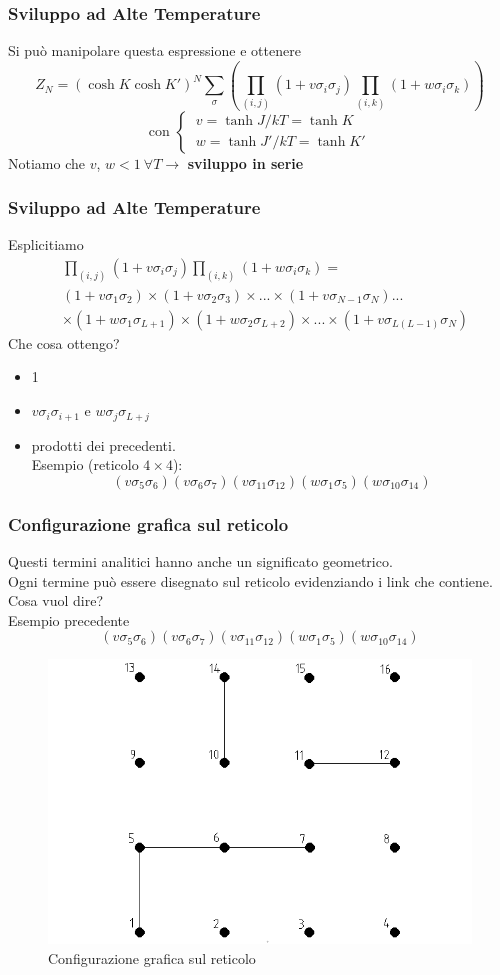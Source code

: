\documentclass[11pt]{beamer}
\begin{document}
\begin{frame}
\frametitle{Sviluppo ad Alte Temperature}
Si può manipolare questa espressione e ottenere
$$
Z_N=(\cosh{K}\cosh{K'})^N\sum_{\sigma}\left(\prod_{(i,j)}(1+v\sigma_i\sigma_j)\prod_{(i,k)}(1+w\sigma_i\sigma_k)\right) 
$$
$$
\mbox{con \ } \begin{cases} \  v=\tanh{J/kT}=\tanh{K} \\  \ w=\tanh{J'/kT}=\tanh{K'}
\end{cases}
$$
Notiamo che
$v$, $w<1 \ \forall T \to$ \textbf{sviluppo in serie}

\end{frame}
\begin{frame}
	\frametitle{Sviluppo ad Alte Temperature}
Esplicitiamo
	\begin{equation}
	\begin{split}
&\prod_{(i,j)}(1+v\sigma_i\sigma_j)\prod_{(i,k)}(1+w\sigma_i\sigma_k)=\\ 
&(1+v\sigma_1\sigma_2)\times(1+v\sigma_2\sigma_3)\times...\times(1+v\sigma_{N-1}\sigma_{N})... \\ & \times(1+w\sigma_1\sigma_{L+1})\times(1+w\sigma_2\sigma_{L+2})\times...\times(1+v\sigma_{L(L-1)}\sigma_{N})
	\end{split}
	\end{equation}
	Che cosa ottengo?
	\begin{itemize}
	\item{1}
	\item{$v\sigma_i\sigma_{i+1} $ e $ w\sigma_j\sigma_{L+j}$}
	\item{prodotti dei precedenti. \\
	Esempio (reticolo $4\times4$):
$$(v\sigma_{5}\sigma_{6})(v\sigma_{6}\sigma_{7})(v\sigma_{11}\sigma_{12})(w\sigma_{1}\sigma_{5})(w\sigma_{10}\sigma_{14})
$$ }
	\end{itemize}
\end{frame}


\begin{frame}
\frametitle{Configurazione grafica sul reticolo}
 Questi termini analitici hanno anche un significato geometrico.\\

Ogni termine può essere disegnato sul reticolo evidenziando i link che contiene. Cosa vuol dire? \\
Esempio precedente
$$(v\sigma_{5}\sigma_{6})(v\sigma_{6}\sigma_{7})(v\sigma_{11}\sigma_{12})(w\sigma_{1}\sigma_{5})(w\sigma_{10}\sigma_{14})
$$
\begin{figure}[r]
	\centering
	\includegraphics[width=0.5\columnwidth]{sat21}
	\caption{Configurazione grafica sul reticolo}
	\label{fig1}
	\end{figure}
\end{frame}
\end{document}
